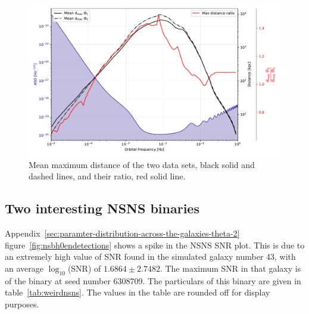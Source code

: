 \documentclass[journal, twocolumns]{IEEEtran}
\begin{document}
    \begin{figure}[!h]
        \centering
        \includegraphics[width=\columnwidth]{analysis_data/004__images_for_latex/d_max_difference}
        \caption{Mean maximum distance of the two data sets, black solid and dashed lines, and their ratio, red solid line.}
        \label{fig:dmaxdifference}
    \end{figure}

    \subsection{Two interesting NSNS binaries}
    \label{subsec:twointerestingnsnsbinaries}

    Appendix~\ref{sec:paramter-distribution-across-the-galaxies-theta-2} figure~\ref{fig:nsbh0endetections} shows a spike in the NSNS SNR plot.
    This is due to an extremely high value of SNR found in the simulated galaxy number 43, with an average $\log_{10}$(SNR) of $1.6864\pm2.7482$.
    The maximum SNR in that galaxy is of the binary at seed number 6308709.
    The particulars of this binary are given in table~\ref{tab:weirdnsns}.
    The values in the table are rounded off for display purposes.
\end{document}
